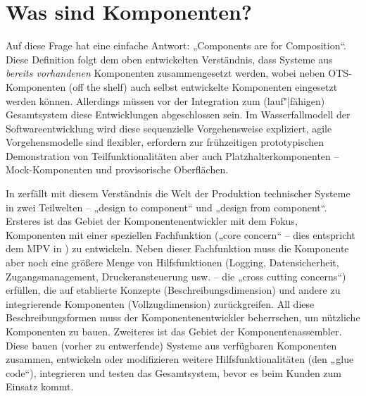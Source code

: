 \documentclass[11pt,a4paper]{article}
\begin{document}
\section{Was sind Komponenten?}

Auf diese Frage hat \cite{Szyperski2002} eine einfache Antwort: „Components
are for Composition“.  Diese Definition folgt dem oben entwickelten
Verständnis, dass Systeme aus \emph{bereits vorhandenen} Komponenten
zusammengesetzt werden, wobei neben OTS-Komponenten (off the shelf) auch
selbst entwickelte Komponenten eingesetzt werden können. Allerdings müssen vor
der Integration zum (lauf"|fähigen) Gesamtsystem diese Entwicklungen
abgeschlossen sein. Im Wasserfallmodell der Softwareentwicklung wird diese
sequenzielle Vorgehensweise expliziert, agile Vorgehensmodelle sind flexibler,
erfordern zur frühzeitigen prototypischen Demonstration von
Teilfunktionalitäten aber auch Platzhalterkomponenten -- Mock-Komponenten und
provisorische Oberflächen.

In \cite{Szyperski2002} zerfällt mit diesem Verständnis die Welt der
Produktion technischer Systeme in zwei Teilwelten -- „design to component“ und
„design from component“. Ersteres ist das Gebiet der Komponentenentwickler mit
dem Fokus, Komponenten mit einer speziellen Fachfunktion („core concern“ --
dies entspricht dem MPV in \cite{TESE2018}) zu entwickeln. Neben dieser
Fachfunktion muss die Komponente aber noch eine größere Menge von
Hilfsfunktionen (Logging, Datensicherheit, Zugangsmanagement,
Druckeransteuerung usw. -- die „cross cutting concerns“) erfüllen, die auf
etablierte Konzepte (Beschreibungsdimension) und andere zu integrierende
Komponenten (Vollzugdimension) zurückgreifen.  All diese Beschreibungsformen
muss der Komponentenentwickler beherrschen, um nützliche Komponenten zu bauen.
Zweiteres ist das Gebiet der Komponentenassembler. Diese bauen (vorher zu
entwerfende) Systeme aus verfügbaren Komponenten zusammen, entwickeln oder
modifizieren weitere Hilfsfunktionalitäten (den „glue code“), integrieren und
testen das Gesamtsystem, bevor es beim Kunden zum Einsatz kommt.
\end{document}
